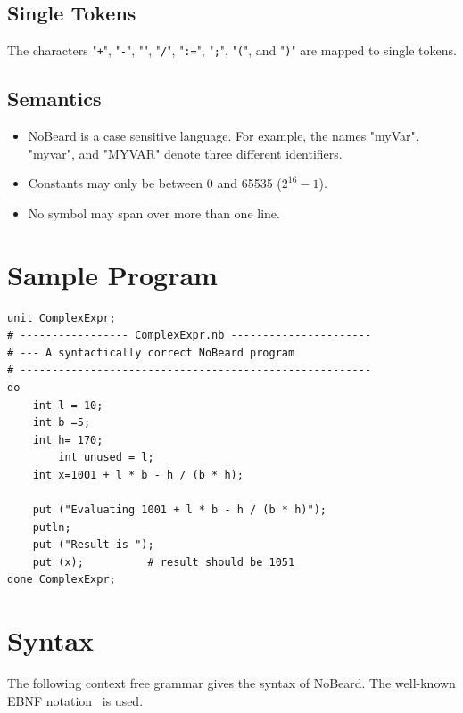 \documentclass[11pt]{report}
\newcommand{\leongage}{NoBeard}
\begin{document}
\subsection{Single Tokens}
The characters "{\tt+}", "{\tt-}", "{\tt*}", "{\tt/}", "{\tt:=}", "{\tt;}", "{\tt(}", and "{\tt)}" are mapped to single tokens.

\subsection{Semantics}
\begin{itemize}
	\item \leongage{} is a case sensitive language. For example, the names "myVar", "myvar", and "MYVAR" denote three different identifiers.
	\item Constants may only be between 0 and 65535 ($2^{16} - 1$).
	\item No symbol may span over more than one line.
\end{itemize}

\section{Sample Program}
\lstset{language=NoBeard}

\begin{lstlisting}
unit ComplexExpr;
# ----------------- ComplexExpr.nb ----------------------
# --- A syntactically correct NoBeard program
# -------------------------------------------------------
do
    int l = 10;
    int b =5;
    int h= 170;
        int unused = l;
    int x=1001 + l * b - h / (b * h);

    put ("Evaluating 1001 + l * b - h / (b * h)");
    putln;
    put ("Result is ");
    put (x);          # result should be 1051
done ComplexExpr;
\end{lstlisting}

\section{Syntax}
The following context free grammar gives the syntax of \leongage{}. The well-known EBNF notation~\cite{wirth_what_1977} is used.
\end{document}
